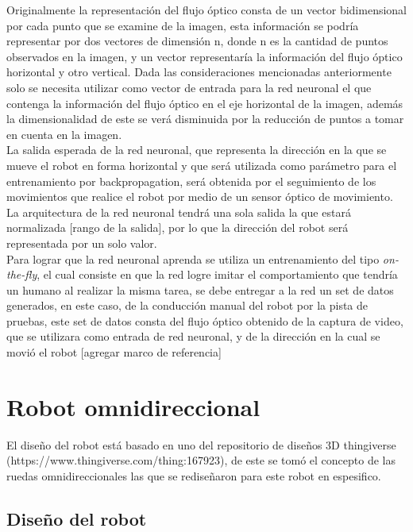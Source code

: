 \documentclass{iccmemoria}
\begin{document}
Originalmente la representación del flujo óptico consta de un vector bidimensional por cada punto que se examine de la imagen, esta información se podría representar por dos vectores de dimensión n, donde n es la cantidad de puntos observados en la imagen, y un vector representaría la información del flujo óptico horizontal y otro vertical. Dada las consideraciones mencionadas anteriormente solo se necesita utilizar como vector de entrada para la red neuronal el que contenga la información del flujo óptico en el eje horizontal de la imagen, además la dimensionalidad de este se verá disminuida por la reducción de puntos a tomar en cuenta en la imagen.\\

La salida esperada de la red neuronal, que representa la dirección en la que se mueve el robot en forma horizontal y que será utilizada como parámetro para el entrenamiento por backpropagation, será obtenida por el seguimiento de los movimientos que realice el robot por medio de un sensor óptico de movimiento. La arquitectura de la red neuronal tendrá una sola salida la que estará normalizada [rango de la salida], por lo que la dirección del robot será representada por un solo valor.\\

Para lograr que la red neuronal aprenda se utiliza un entrenamiento del tipo \emph{on-the-fly}, el cual consiste en que la red logre imitar el comportamiento que tendría un humano al realizar la misma tarea, se debe entregar a la red un set de datos generados, en este caso, de la conducción manual del robot por la pista de pruebas, este set de datos consta del flujo óptico obtenido de la captura de video, que se utilizara como entrada de red neuronal, y de la dirección en la cual se movió el robot [agregar marco de referencia] \\

\section{Robot omnidireccional}

El diseño del robot está basado en uno del repositorio de diseños 3D thingiverse (https://www.thingiverse.com/thing:167923), de este se tomó el concepto de las ruedas omnidireccionales las que se rediseñaron para este robot en espesifico.\\

\subsection{Diseño del robot}
\end{document}
